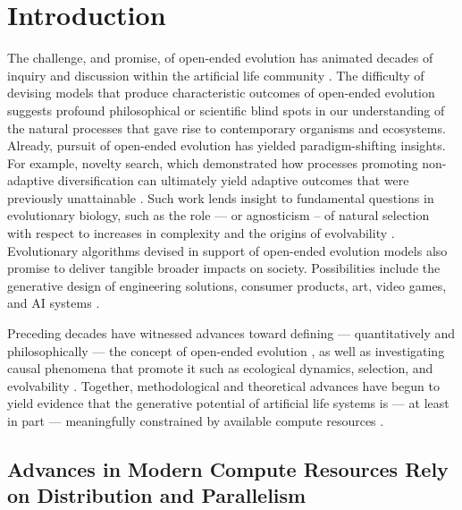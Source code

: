 \section{Introduction}

The challenge, and promise, of open-ended evolution has animated decades of inquiry and discussion within the artificial life community \citep{packard2019overview}.
The difficulty of devising models that produce characteristic outcomes of open-ended evolution suggests profound philosophical or scientific blind spots in our understanding of the natural processes that gave rise to contemporary organisms and ecosystems.
Already, pursuit of open-ended evolution has yielded paradigm-shifting insights.
For example, novelty search, which demonstrated how processes promoting non-adaptive diversification can ultimately yield adaptive outcomes that were previously unattainable \citep{lehman2011abandoning}.
Such work lends insight to fundamental questions in evolutionary biology, such as the role --- or agnosticism -- of natural selection with respect to increases in complexity \citep{lehman2012evolution, lynch2007frailty} and the origins of evolvability \citep{lehman2013evolvability, kirschner1998evolvability}.
Evolutionary algorithms devised in support of open-ended evolution models also promise to deliver tangible broader impacts on society.
Possibilities include the generative design of engineering solutions, consumer products, art, video games, and AI systems \citep{nguyen2015innovation, stanley2017open}.

Preceding decades have witnessed advances toward defining --- quantitatively and philosophically --- the concept of open-ended evolution \citep{lehman2012beyond, dolson2019modes, bedau1998classification}, as well as investigating causal phenomena that promote it such as ecological dynamics, selection, and evolvability \citep{dolson2019constructive, soros2014identifying, huizinga2018emergence}.
Together, methodological and theoretical advances have begun to yield evidence that the generative potential of artificial life systems is --- at least in part --- meaningfully constrained by available compute resources \citep{channon2019maximum}. %

\subsection{Advances in Modern Compute Resources Rely on Distribution and Parallelism}

